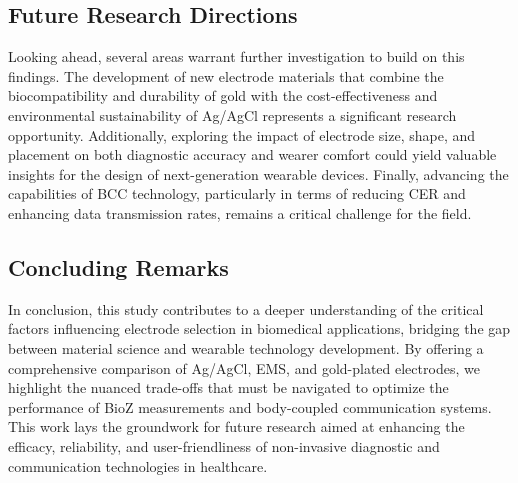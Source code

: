 \documentclass[conference]{IEEEtran}
\begin{document}
\subsection{Future Research Directions}

Looking ahead, several areas warrant further investigation to build on this findings. The development of new electrode materials that combine the biocompatibility and durability of gold with the cost-effectiveness and environmental sustainability of Ag/AgCl represents a significant research opportunity. Additionally, exploring the impact of electrode size, shape, and placement on both diagnostic accuracy and wearer comfort could yield valuable insights for the design of next-generation wearable devices. Finally, advancing the capabilities of \gls{BCC} technology, particularly in terms of reducing \gls{CER} and enhancing data transmission rates, remains a critical challenge for the field.

\subsection{Concluding Remarks}

In conclusion, this study contributes to a deeper understanding of the critical factors influencing electrode selection in biomedical applications, bridging the gap between material science and wearable technology development. By offering a comprehensive comparison of Ag/AgCl, \gls{EMS}, and gold-plated electrodes, we highlight the nuanced trade-offs that must be navigated to optimize the performance of \gls{BioZ} measurements and body-coupled communication systems. This work lays the groundwork for future research aimed at enhancing the efficacy, reliability, and user-friendliness of non-invasive diagnostic and communication technologies in healthcare.
\end{document}
